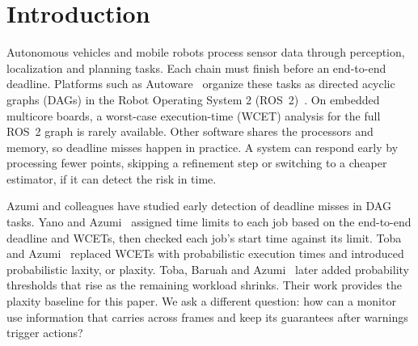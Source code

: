 \documentclass[acmsmall,screen]{acmart}
\begin{document}
\maketitle
{}
\pagestyle{standardpagestyle}

\section{Introduction}\label{sec:intro}

Autonomous vehicles and mobile robots process sensor data through perception, localization and planning tasks. Each chain must finish before an end-to-end deadline. Platforms such as Autoware~\cite{kato2018autoware} organize these tasks as directed acyclic graphs (DAGs) in the Robot Operating System 2 (ROS~2)~\cite{macenski2022ros2}. On embedded multicore boards, a worst-case execution-time (WCET) analysis for the full ROS~2 graph is rarely available. Other software shares the processors and memory, so deadline misses happen in practice. A system can respond early by processing fewer points, skipping a refinement step or switching to a cheaper estimator, if it can detect the risk in time.

Azumi and colleagues have studied early detection of deadline misses in DAG tasks. Yano and Azumi~\cite{yano2023access} assigned time limits to each job based on the end-to-end deadline and WCETs, then checked each job's start time against its limit. Toba and Azumi~\cite{toba2024} replaced WCETs with probabilistic execution times and introduced probabilistic laxity, or plaxity. Toba, Baruah and Azumi~\cite{toba2026} later added probability thresholds that rise as the remaining workload shrinks. Their work provides the plaxity baseline for this paper. We ask a different question: how can a monitor use information that carries across frames and keep its guarantees after warnings trigger actions?
\end{document}
